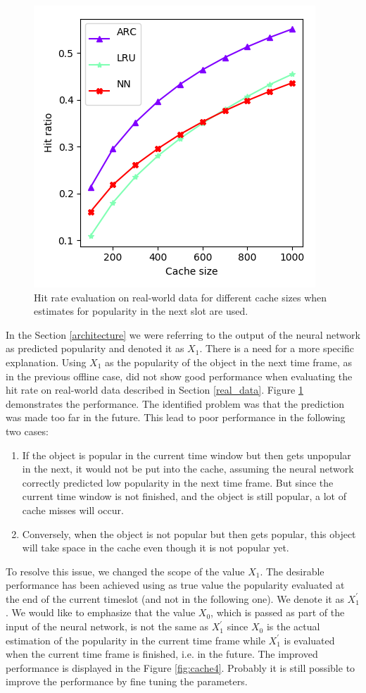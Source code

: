 \begin{figure}[b!]
	\centering
	\captionsetup{justification=centering}
	\includegraphics[width=0.5\linewidth]{pics/cache3.png}
	\caption{Hit rate evaluation on real-world data for different cache sizes when estimates for popularity in the next slot are used.}
	\label{fig:cache3}
\end{figure}

In the Section \ref{architecture} we were referring to the output of the neural network as predicted popularity and denoted it as $X_1$. There is a need for a more specific explanation. Using $X_1$ as the popularity of the object in the next time frame, as in the previous offline case, did not show good performance when evaluating the hit rate on real-world data described in Section \ref{real_data}. Figure \ref{fig:cache3} demonstrates the performance. The identified problem was that the prediction was made too far in the future. This lead to poor performance in the following two cases:

\begin{enumerate}
	\item If the object is popular in the current time window but then gets unpopular in the next, it would not be put into the cache, assuming the neural network correctly predicted low popularity in the next time frame. But since the current time window is not finished, and the object is still popular, a lot of cache misses will occur.
	\item Conversely, when the object is not popular but then gets popular, this object will take space in the cache even though it is not popular yet.
\end{enumerate}

To resolve this issue, we changed the scope of the value $X_1$. The desirable performance has been achieved using as true value the popularity evaluated at the end of the current timeslot (and not in the following one). We denote it as $X_1^{'}$. We would like to emphasize that the value $X_0$, which is passed as part of the input of the neural network, is not the same as $X_1^{'}$ since $X_0$ is the actual estimation of the popularity in the current time frame while $X_1^{'}$ is evaluated when the current time frame is finished, i.e. in the future. The improved performance is displayed in the Figure \ref{fig:cache4}. Probably it is still possible to improve the performance by fine tuning the parameters. 

